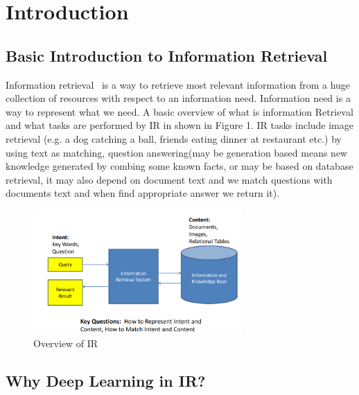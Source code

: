 \documentclass{doublecol-new}
\theoremstyle{TH}{
\newtheorem{lemma}{Lemma}
\newtheorem{theorem}[lemma]{Theorem}
\newtheorem{corrolary}[lemma]{Corrolary}
\newtheorem{conjecture}[lemma]{Conjecture}
\newtheorem{proposition}[lemma]{Proposition}
\newtheorem{claim}[lemma]{Claim}
\newtheorem{stheorem}[lemma]{Wrong Theorem}
\newtheorem{algorithm}{Algorithm}
}
\theoremstyle{THrm}{
\newtheorem{definition}{Definition}[section]
\newtheorem{question}{Question}[section]
\newtheorem{remark}{Remark}
\newtheorem{scheme}{Scheme}
}
\theoremstyle{THhit}{
\newtheorem{case}{Case}[section]
}
\begin{document}

\maketitle

\clearpage






 \section{Introduction}

\subsection{Basic Introduction to Information Retrieval}
Information retrieval~\cite{6182576} is a way to retrieve most relevant information from a huge collection of resources with respect to an information need. Information need is a way to represent what we need. A basic overview of what is information Retrieval and what tasks are performed by IR in shown in Figure 1. IR tasks include image retrieval (e.g. a dog catching a ball, friends eating dinner at restaurant etc.)  by using text as matching, question answering(may be generation based means new knowledge generated by combing some known facts, or may be based on database retrieval, it may also depend on document text and we match questions with documents text and when find appropriate answer we return it).
\begin{figure}[h]
	\caption{Overview of IR}
	\centerline{\includegraphics[width=8cm,keepaspectratio]{image/overviewIR.PNG}}
	\label{fig:docpublish}
\end{figure}


\subsection{Why Deep Learning in IR?}
\end{document}

